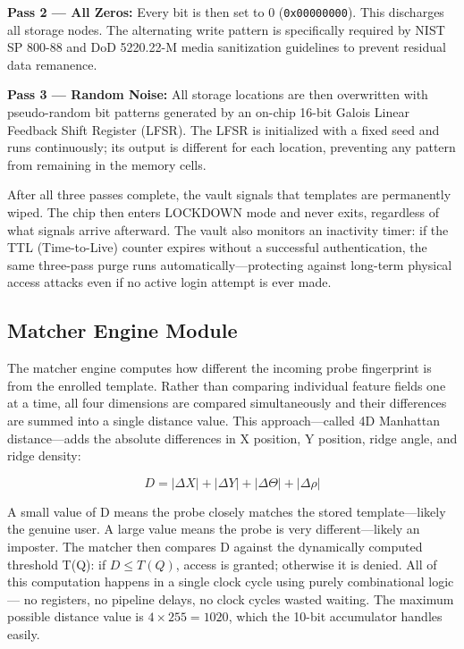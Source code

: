 \documentclass[conference]{IEEEtran}
\begin{document}
\textbf{Pass 2 --- All Zeros:} Every bit is then set to 0
(\texttt{0x00000000}). This discharges all storage nodes. The
alternating write pattern is specifically required by NIST SP 800-88
and DoD 5220.22-M media sanitization guidelines to prevent residual
data remanence.

\textbf{Pass 3 --- Random Noise:} All storage locations are then
overwritten with pseudo-random bit patterns generated by an on-chip
16-bit Galois Linear Feedback Shift Register (LFSR). The LFSR
is initialized with a fixed seed and runs continuously; its output
is different for each location, preventing any pattern from remaining
in the memory cells.

After all three passes complete, the vault signals that templates are
permanently wiped. The chip then enters LOCKDOWN mode and never exits,
regardless of what signals arrive afterward. The vault also monitors
an inactivity timer: if the TTL (Time-to-Live) counter expires without
a successful authentication, the same three-pass purge runs
automatically---protecting against long-term physical access attacks
even if no active login attempt is ever made.

\subsection{Matcher Engine Module}

The matcher engine computes how different the incoming probe
fingerprint is from the enrolled template. Rather than comparing
individual feature fields one at a time, all four dimensions are
compared simultaneously and their differences are summed into a
single distance value. This approach---called 4D Manhattan
distance---adds the absolute differences in X position, Y position,
ridge angle, and ridge density:

\begin{equation}
D = |\Delta X| + |\Delta Y| + |\Delta\Theta| + |\Delta\rho|
\end{equation}

A small value of D means the probe closely matches the stored
template---likely the genuine user. A large value means the probe
is very different---likely an imposter. The matcher then compares
D against the dynamically computed threshold T(Q): if $D \leq T(Q)$,
access is granted; otherwise it is denied. All of this computation
happens in a single clock cycle using purely combinational logic---
no registers, no pipeline delays, no clock cycles wasted waiting.
The maximum possible distance value is $4 \times 255 = 1020$,
which the 10-bit accumulator handles easily.
\end{document}
